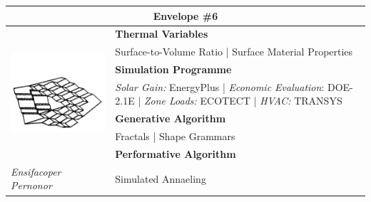 \begin{table}
	\begin{tabular}{ | m{6cm} | m{14cm} |}
	\toprule
	\multicolumn{2}{c}{Envelope \#{}6} \\[1cm] \hline
	\multirow{7}{*}{\includegraphics[width=5.5cm]{./Images/15-Envelope6}} & \textbf{Thermal Variables} \\[1cm]
	& Surface-to-Volume Ratio | Surface Material Properties \vspace{0.5cm}\\ \cline{2-2}
		 & \textbf{Simulation Programme} \\[1cm]
		 & \emph{Solar Gain:} EnergyPlus | \emph{Economic Evaluation}: DOE-2.1E | \emph{Zone Loads:} ECOTECT | \emph{HVAC:} TRANSYS \vspace{0.5cm}\\ \cline{2-2}
		 & \textbf{Generative Algorithm} \\[1cm]
		 & Fractals | Shape Grammars\vspace{0.5cm}\\ \cline{2-2}
		 & \textbf{Performative Algorithm} \\[1cm]
		 \emph{Ensifacoper Pernonor} &  Simulated Annaeling\vspace{0.5cm}\\
	\bottomrule
	\end{tabular}
\end{table}

\clearpage

